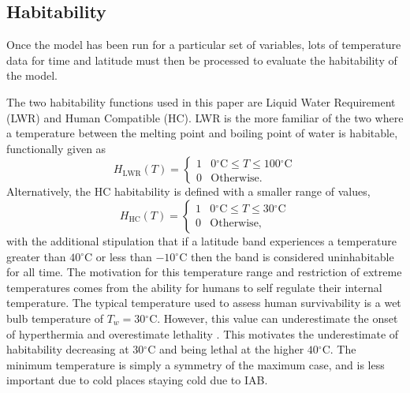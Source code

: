 \documentclass[12pt, onecolumn]{revtex4-2}    %
\newcommand{\degreesC}{\ensuremath{^{\circ}\text{C}}}
\begin{document}

\subsection{Habitability} \label{ssec:Habitability_intro}
Once the model has been run for a particular set of variables, lots of temperature data for time and latitude must then be processed to evaluate the habitability of the model.

The two habitability functions used in this paper are Liquid Water Requirement (LWR) and Human Compatible (HC).
LWR is the more familiar of the two where a temperature between the melting point and boiling point of water is habitable, functionally given as
\begin{equation}
  H_\text{LWR}(T) =
  \begin{cases}
    1 & 0\degreesC \le T \le 100\degreesC \\
    0 & \text{Otherwise.}
  \end{cases}
  \label{eq:H_LWR}
\end{equation}
Alternatively, the HC habitability is defined with a smaller range of values,
\begin{equation}
  H_\text{HC}(T) =
  \begin{cases}
    1 & 0\degreesC \le T \le 30\degreesC \\
    0 & \text{Otherwise,}
  \end{cases}
  \label{eq:H_HC}
\end{equation}
with the additional stipulation that if a latitude band experiences a temperature greater than $40\degreesC$ or less than $-10\degreesC$ then the band is considered uninhabitable for all time.
The motivation for this temperature range and restriction of extreme temperatures comes from the ability for humans to self regulate their internal temperature.
The typical temperature used to assess human survivability is a wet bulb temperature of $T_w = 30\degreesC$.
However, this value can underestimate the onset of hyperthermia and overestimate lethality \cite{LuRomps2023}.
This motivates the underestimate of habitability decreasing at $30\degreesC$ and being lethal at the higher $40\degreesC$.
The minimum temperature is simply a symmetry of the maximum case, and is less important due to cold places staying cold due to IAB.
\end{document}
